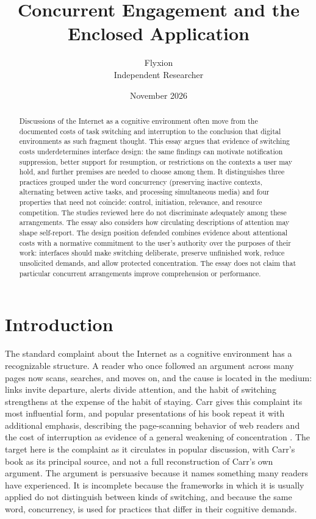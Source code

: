 \documentclass[12pt]{article}
\title{Concurrent Engagement and the Enclosed Application}
\author{Flyxion\\Independent Researcher}
\date{November 2026}
\begin{document}
\maketitle

\begin{abstract}
Discussions of the Internet as a cognitive environment often move from the documented costs of task switching and interruption to the conclusion that digital environments as such fragment thought. This essay argues that evidence of switching costs underdetermines interface design: the same findings can motivate notification suppression, better support for resumption, or restrictions on the contexts a user may hold, and further premises are needed to choose among them. It distinguishes three practices grouped under the word concurrency (preserving inactive contexts, alternating between active tasks, and processing simultaneous media) and four properties that need not coincide: control, initiation, relevance, and resource competition. The studies reviewed here do not discriminate adequately among these arrangements. The essay also considers how circulating descriptions of attention may shape self-report. The design position defended combines evidence about attentional costs with a normative commitment to the user's authority over the purposes of their work: interfaces should make switching deliberate, preserve unfinished work, reduce unsolicited demands, and allow protected concentration. The essay does not claim that particular concurrent arrangements improve comprehension or performance.
\end{abstract}

\newpage
\section{Introduction}

The standard complaint about the Internet as a cognitive environment has a recognizable structure. A reader who once followed an argument across many pages now scans, searches, and moves on, and the cause is located in the medium: links invite departure, alerts divide attention, and the habit of switching strengthens at the expense of the habit of staying. Carr gives this complaint its most influential form, and popular presentations of his book repeat it with additional emphasis, describing the page-scanning behavior of web readers and the cost of interruption as evidence of a general weakening of concentration \cite{carr2010shallows, academicagent2026}. The target here is the complaint as it circulates in popular discussion, with Carr's book as its principal source, and not a full reconstruction of Carr's own argument. The argument is persuasive because it names something many readers have experienced. It is incomplete because the frameworks in which it is usually applied do not distinguish between kinds of switching, and because the same word, concurrency, is used for practices that differ in their cognitive demands.
\end{document}
